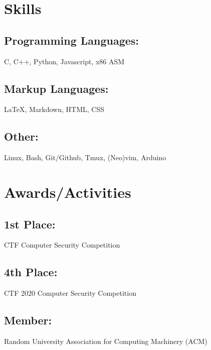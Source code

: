 \documentclass{article}
\begin{document}
\section{Skills}
\subsection{Programming Languages:}
C, C++, Python, Javascript, x86 ASM
\subsection{Markup Languages:}
{\LaTeX}, Markdown, HTML, CSS
\subsection{Other:}
Linux, Bash, Git/Github, Tmux, (Neo)vim, Arduino

\section{Awards/Activities}
\subsection{1st Place: } CTF Computer Security Competition
\subsection{4th Place: } CTF 2020 Computer Security Competition
\subsection{Member: } Random University Association for Computing Machinery (ACM)
\end{document}
